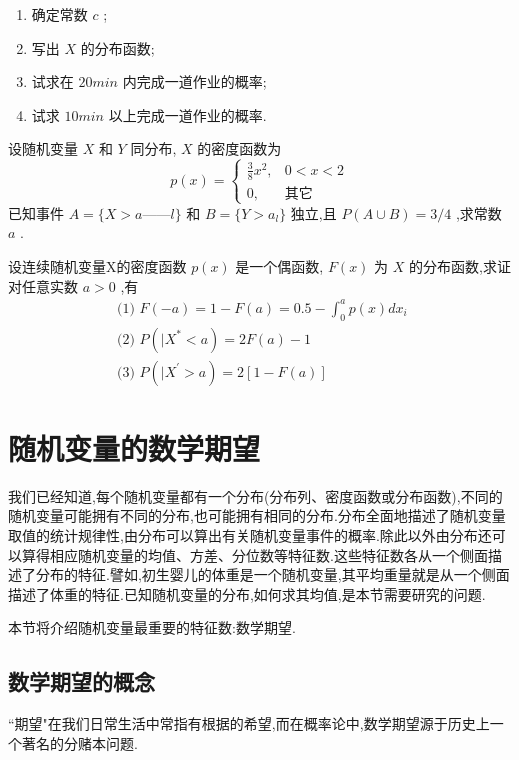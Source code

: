 \begin{xiti}
\begin{enumerate}
\item 确定常数 $ c $ ;
\item 写出 $ X $ 的分布函数;
\item 试求在 $ 20min $ 内完成一道作业的概率;
\item 试求 $ 10min $ 以上完成一道作业的概率.
\end{enumerate}
\item 设随机变量 $ X $ 和 $ Y $ 同分布, $ X $ 的密度函数为
\[ 
p(x)=\left\{\begin{array}{ll}
{\frac{3}{8} x^{2},} & {0<x<2} \\ 
{0,} & {\text{其它}}
\end{array}\right.
\]
已知事件 $ A=\{X>a——l\} $ 和 $ B=\{Y>a_l\} $ 独立,且 $ P(A \cup B)=3 / 4 $ ,求常数 $ a $ .
\item 设连续随机变量X的密度函数 $ p(x) $ 是一个偶函数, $ F(x) $ 为 $ X $ 的分布函数,求证对任意实数 $ a>0 $ ,有
\[ 
\begin{array}{l}{\text { (1) } F(-a)=1-F(a)=0.5-\int_{0}^{a} p(x) d x_{i}} \\ {\text { (2) } P\left( | X^{*}<a\right)=2 F(a)-1} \\ {\text { (3) } P\left( | X^{\prime}>a\right)=2[1-F(a)]}\end{array}
\]
\end{xiti}

\section{随机变量的数学期望}\label{sec:2.2}

我们已经知道,每个随机变量都有一个分布(分布列、密度函数或分布函数),不同的随机变量可能拥有不同的分布,也可能拥有相同的分布.分布全面地描述了随机变量取值的统计规律性,由分布可以算出有关随机变量事件的概率.除此以外由分布还可以算得相应随机变量的均值、方差、分位数等特征数.这些特征数各从一个侧面描述了分布的特征.譬如,初生婴儿的体重是一个随机变量,其平均重量就是从一个侧面描述了体重的特征.已知随机变量的分布,如何求其均值,是本节需要研究的问题.

本节将介绍随机变量最重要的特征数:数学期望.

\subsection{数学期望的概念}\label{ssec:2.2.1}

``期望"在我们日常生活中常指有根据的希望,而在概率论中,数学期望源于历史上一个著名的分赌本问题.

